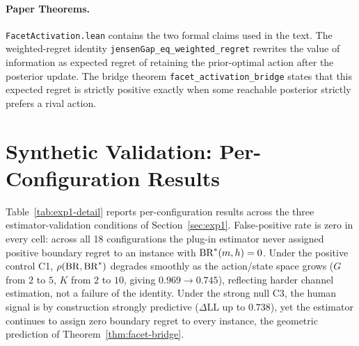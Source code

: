 \paragraph{Paper Theorems.}
\texttt{FacetActivation.lean} contains the two formal claims used in the text.
The weighted-regret identity \texttt{jensenGap\_eq\_weighted\_regret} rewrites the value of information as expected regret of retaining the prior-optimal action after the posterior update.
The bridge theorem \texttt{facet\_activation\_bridge} states that this expected regret is strictly positive exactly when some reachable posterior strictly prefers a rival action.

\section{Synthetic Validation: Per-Configuration Results}
\label{app:exp1-detail}

Table~\ref{tab:exp1-detail} reports per-configuration results across the three estimator-validation conditions of Section~\ref{sec:exp1}.
False-positive rate is zero in every cell: across all 18 configurations the plug-in estimator never assigned positive boundary regret to an instance with $\operatorname{BR}^{*}(m,h)=0$.
Under the positive control C1, $\rho(\operatorname{BR},\operatorname{BR}^{*})$ degrades smoothly as the action/state space grows ($G$ from $2$ to $5$, $K$ from $2$ to $10$, giving $0.969 \to 0.745$), reflecting harder channel estimation, not a failure of the identity.
Under the strong null C3, the human signal is by construction strongly predictive ($\Delta\mathrm{LL}$ up to $0.738$), yet the estimator continues to assign zero boundary regret to every instance, the geometric prediction of Theorem~\ref{thm:facet-bridge}.

